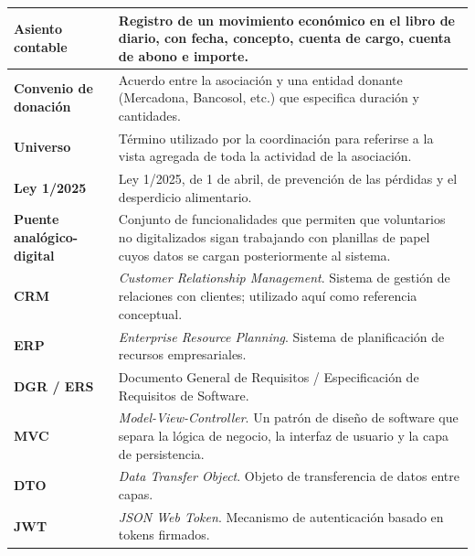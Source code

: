 \begin{longtable}[]{@{}
        p{}
        p{}@{}}
    \textbf{Asiento contable} & Registro de un movimiento económico en el
    libro de diario, con fecha, concepto, cuenta de cargo, cuenta de abono e
    importe. \\
    \midrule

    \textbf{Convenio de donación} & Acuerdo entre la asociación y una
    entidad donante (Mercadona, Bancosol, etc.) que especifica duración y
    cantidades. \\
    \midrule
    
    \textbf{Universo} & Término utilizado por la coordinación para referirse
    a la vista agregada de toda la actividad de la asociación. \\
    \midrule

    \textbf{Ley 1/2025} & Ley 1/2025, de 1 de abril, de prevención de las
    pérdidas y el desperdicio alimentario. \\
    \midrule
    
    \textbf{Puente analógico-digital} & Conjunto de funcionalidades que
    permiten que voluntarios no digitalizados sigan trabajando con planillas
    de papel cuyos datos se cargan posteriormente al sistema. \\
    \midrule
    
    \textbf{CRM} & \emph{Customer Relationship Management}. Sistema de
    gestión de relaciones con clientes; utilizado aquí como referencia
    conceptual. \\
    \midrule
    
    \textbf{ERP} & \emph{Enterprise Resource Planning}. Sistema de
    planificación de recursos empresariales. \\
    \midrule
    
    \textbf{DGR / ERS} & Documento General de Requisitos / Especificación de
    Requisitos de Software. \\
    \midrule
    
    \textbf{MVC} & \emph{Model-View-Controller}. Un patrón de diseño de 
    software que separa la lógica de negocio, la interfaz de usuario y la capa de 
    persistencia. \\
    \midrule
    
    \textbf{DTO} & \emph{Data Transfer Object}. Objeto de transferencia de
    datos entre capas. \\
    \midrule

    \textbf{JWT} & \emph{JSON Web Token}. Mecanismo de autenticación basado
    en tokens firmados. \\
    \midrule


\end{longtable}
